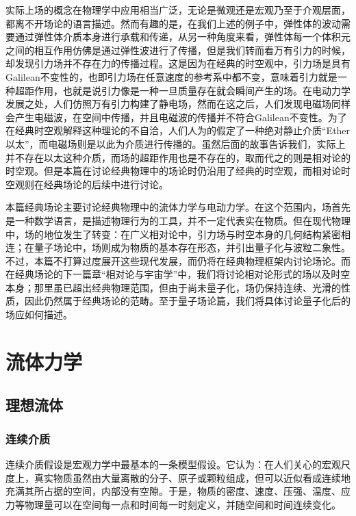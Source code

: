 \documentclass[b5paper]{book}
\begin{document}
实际上场的概念在物理学中应用相当广泛，无论是微观还是宏观乃至于介观层面，都离不开场论的语言描述。然而有趣的是，在我们上述的例子中，弹性体的波动需要通过弹性体介质本身进行承载和传递，从另一种角度来看，弹性体每一个体积元之间的相互作用仿佛是通过弹性波进行了传播，但是我们转而看万有引力的时候，却发现引力场并不存在力的传播过程。这是因为在经典的时空观中，引力场是具有Galilean不变性的，也即引力场在任意速度的参考系中都不变，意味着引力就是一种超距作用，也就是说引力像是一种一旦质量存在就会瞬间产生的场。在电动力学发展之处，人们仿照万有引力构建了静电场，然而在这之后，人们发现电磁场同样会产生电磁波，在空间中传播，并且电磁波的传播并不符合Galilean不变性。为了在经典时空观解释这种理论的不自洽，人们人为的假定了一种绝对静止介质“Ether以太”，而电磁场则是以此为介质进行传播的。虽然后面的故事告诉我们，实际上并不存在以太这种介质，而场的超距作用也是不存在的，取而代之的则是相对论的时空观。但是本篇在讨论经典物理中的场论时仍沿用了经典的时空观，而相对论时空观则在经典场论的后续中进行讨论。

本篇经典场论主要讨论经典物理中的流体力学与电动力学。在这个范围内，场首先是一种数学语言，是描述物理行为的工具，并不一定代表实在物质。但在现代物理中，场的地位发生了转变：在广义相对论中，引力场与时空本身的几何结构紧密相连；在量子场论中，场则成为物质的基本存在形态，并引出量子化与波粒二象性。不过，本篇不打算过度展开这些现代发展，而仍将在经典物理框架内讨论场论。而在经典场论的下一篇章“相对论与宇宙学”中，我们将讨论相对论形式的场以及时空本身；那里虽已超出经典物理范围，但由于尚未量子化，场仍保持连续、光滑的性质，因此仍然属于经典场论的范畴。至于量子场论篇，我们将具体讨论量子化后的场应如何描述。

\part{流体力学}

\chapter{理想流体}

\section{连续介质}
\label{sec:continuity}
连续介质假设是宏观力学中最基本的一条模型假设。它认为：在人们关心的宏观尺度上，真实物质虽然由大量离散的分子、原子或颗粒组成，但可以近似看成连续地充满其所占据的空间，内部没有空隙。于是，物质的密度、速度、压强、温度、应力等物理量可以在空间每一点和时间每一时刻定义，并随空间和时间连续变化。
\end{document}

